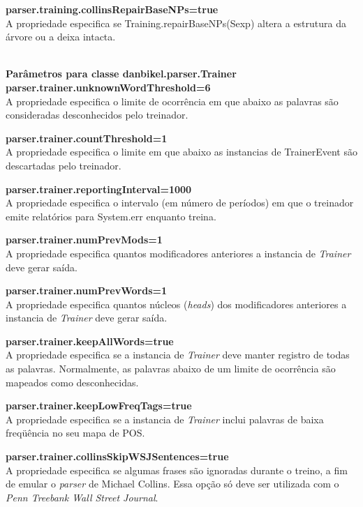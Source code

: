 \textbf{parser.training.collinsRepairBaseNPs=true}\\
A propriedade especifica se Training.repairBaseNPs(Sexp) altera a estrutura da árvore ou a deixa intacta.

\HRule \\

\textbf{Parâmetros para classe danbikel.parser.Trainer}\\

\textbf{parser.trainer.unknownWordThreshold=6}\\
A propriedade especifica o limite de ocorrência em que abaixo as palavras são consideradas desconhecidos pelo treinador.

\textbf{parser.trainer.countThreshold=1}\\
A propriedade especifica o limite em que abaixo as instancias de TrainerEvent são descartadas pelo treinador.

\textbf{parser.trainer.reportingInterval=1000}\\
A propriedade especifica o intervalo (em número de períodos) em que o treinador emite relatórios para System.err enquanto treina.

\textbf{parser.trainer.numPrevMods=1}\\
A propriedade especifica quantos modificadores anteriores a instancia de \emph{Trainer} deve gerar saída.

\textbf{parser.trainer.numPrevWords=1}\\
A propriedade especifica quantos núcleos (\emph{heads}) dos modificadores anteriores a instancia de \emph{Trainer} deve gerar saída.

\textbf{parser.trainer.keepAllWords=true}\\
A propriedade especifica se a instancia de \emph{Trainer} deve manter registro de todas as palavras. Normalmente, as palavras abaixo de um limite de ocorrência são mapeados como desconhecidas.

\textbf{parser.trainer.keepLowFreqTags=true}\\
A propriedade especifica se a instancia de \emph{Trainer} inclui palavras de baixa freqüência no seu mapa de POS.

\textbf{parser.trainer.collinsSkipWSJSentences=true}\\
A propriedade especifica se algumas frases são ignoradas durante o treino, a fim de emular o \emph{parser} de Michael Collins. Essa opção só deve ser utilizada com o \emph{Penn Treebank Wall Street Journal}.

